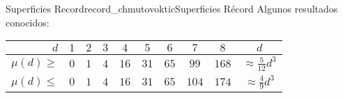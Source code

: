 \begin{surferIntroPage}{Superficies Record}{record_chmutovoktic}{Superficies Récord}
    Algunos resultados conocidos:
    
   \begin{center}
      \begin{tabular}{r|cccccccc|c}
        $d$ & $1$ & $2$ & $3$ & $4$ & $5$ & $6$ & $7$ & $8$ & $d$\\
        \hline
        \hline
        \rule{0pt}{1.2em}$\mu(d)\ge$ & $0$ & $1$ & $4$ & $16$ & $31$ & $65$ &
        $99$ & $168$ & 
        $\approx \frac{5}{12}d^3$\\[0.3em]
        \hline
        \rule{0pt}{1.2em}$\mu(d)\le$ & $0$ & $1$ & $4$ & $16$ & $31$ & $65$ &
        $104$ & $174$ & $\approx \frac{4}{9}d^3$
      \end{tabular}
    \end{center}
  \end{surferIntroPage}
  